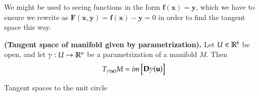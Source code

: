 \begin{rem}
We might be used to seeing functions in the form $\bm{f}(\bm{x}) = \bm{y}$, which we have to ensure we rewrite as $\bm{F}(\bm{x},\bm{y})=\bm{f}(\bm{x})-\bm{y}=0$ in order to find the tangent space this way. 	
\end{rem}

\begin{theorem}
	\textbf{(Tangent space of manifold given by parametrization).} Let $U\in \mathbb{R}^k$ be open, and let $\gamma : U\to \mathbb{R}^n$ be a parametrization of a manifold $M$. Then
	\begin{equation}
		T_{\gamma(\textbf{u})}M = im\begin{bmatrix} \textbf{D}\gamma (\textbf{u}) \end{bmatrix}
	\end{equation}
\end{theorem}

\example Tangent spaces to the unit circle
